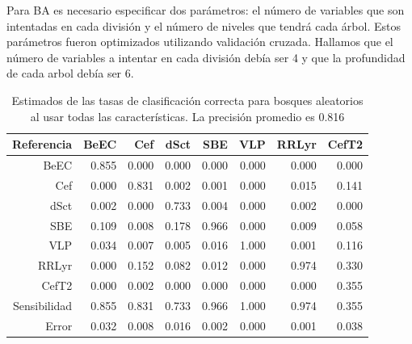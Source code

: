 \documentclass[letterpaper,12pt]{book}
\begin{document}
Para BA es necesario especificar dos parámetros: el número de variables que son intentadas en cada división y el número de niveles que tendrá cada árbol. Estos parámetros fueron optimizados utilizando validación cruzada. Hallamos que el número de variables a intentar en cada división debía ser 4 y que la profundidad de cada arbol debía ser 6. 

\begin{table}[ht]
  \centering
  \begin{tabular}{rrrrrrrr}
    \hline
    \hline
    Referencia& BeEC & Cef & dSct & SBE & VLP & RRLyr & CefT2 \\ 
    \hline
    BeEC & 0.855 & 0.000 & 0.000 & 0.000 & 0.000 & 0.000 & 0.000 \\ 
    Cef & 0.000 & 0.831 & 0.002 & 0.001 & 0.000 & 0.015 & 0.141 \\ 
    dSct & 0.002 & 0.000 & 0.733 & 0.004 & 0.000 & 0.002 & 0.000 \\ 
    SBE & 0.109 & 0.008 & 0.178 & 0.966 & 0.000 & 0.009 & 0.058 \\ 
    VLP & 0.034 & 0.007 & 0.005 & 0.016 & 1.000 & 0.001 & 0.116 \\ 
    RRLyr & 0.000 & 0.152 & 0.082 & 0.012 & 0.000 & 0.974 & 0.330 \\ 
    CefT2 & 0.000 & 0.002 & 0.000 & 0.000 & 0.000 & 0.000 & 0.355 \\ 
    \hline
    Sensibilidad & 0.855 & 0.831 & 0.733 & 0.966 & 1.000 & 0.974 & 0.355 \\
    \hline
    Error & 0.032 & 0.008 & 0.016 & 0.002 & 0.000 & 0.001 & 0.038 \\ 
    \hline
    \hline 
  \end{tabular}
  \caption{Estimados de las tasas de clasificación correcta para bosques aleatorios al usar todas las características. La precisión promedio es 0.816}
\end{table}
\end{document}
